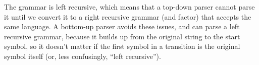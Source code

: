 \begin{enumerate}
  The grammar is left recursive, which means that a top-down parser cannot parse it until we convert it to a right recursive grammar (and factor) that accepts the same language. A bottom-up parser avoids these issues, and can parse a left recursive grammar, because it builds up from the original string to the start symbol, so it doesn't matter if the first symbol in a transition is the original symbol itself (or, less confusingly, ``left recursive'').

\end{enumerate}


